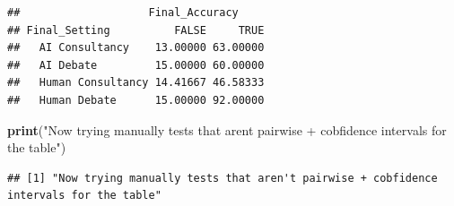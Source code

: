 \documentclass[
]{article}
\newenvironment{Shaded}{\begin{snugshade}}{\end{snugshade}}
\newcommand{\FunctionTok}[1]{\textcolor[rgb]{0.13,0.29,0.53}{\textbf{#1}}}
\newcommand{\NormalTok}[1]{#1}
\newcommand{\StringTok}[1]{\textcolor[rgb]{0.31,0.60,0.02}{#1}}
\begin{document}
\begin{verbatim}
##                    Final_Accuracy
## Final_Setting          FALSE     TRUE
##   AI Consultancy    13.00000 63.00000
##   AI Debate         15.00000 60.00000
##   Human Consultancy 14.41667 46.58333
##   Human Debate      15.00000 92.00000
\end{verbatim}

\begin{Shaded}
\begin{Highlighting}[]
\FunctionTok{print}\NormalTok{(}\StringTok{"Now trying manually tests that aren\textquotesingle{}t pairwise + cobfidence intervals for the table"}\NormalTok{)}
\end{Highlighting}
\end{Shaded}

\begin{verbatim}
## [1] "Now trying manually tests that aren't pairwise + cobfidence intervals for the table"
\end{verbatim}
\end{document}
